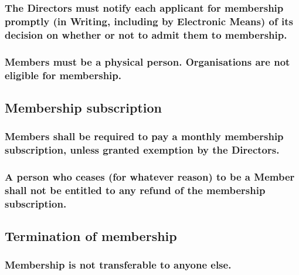 \documentclass[12pt]{article}
\begin{document}
\subsubsection[Directors must notify potential Members of a decision]{The Directors must notify each applicant for membership promptly (in Writing, including by Electronic Means) of its decision on whether or not to admit them to membership.} %
\subsubsection[Members may not be organisations]{Members must be a physical person. Organisations are not eligible for membership.} %

\subsection{Membership subscription}
\subsubsection[Members pay monthly subscription]{Members shall be required to pay a monthly membership subscription, unless granted exemption by the Directors.}
\subsubsection[Members not entitled to refund of subscription]{A person who ceases (for whatever reason) to be a Member shall not be entitled to any refund of the membership subscription.}

\subsection{Termination of membership}
\subsubsection{Membership is not transferable to anyone else.}
\end{document}
